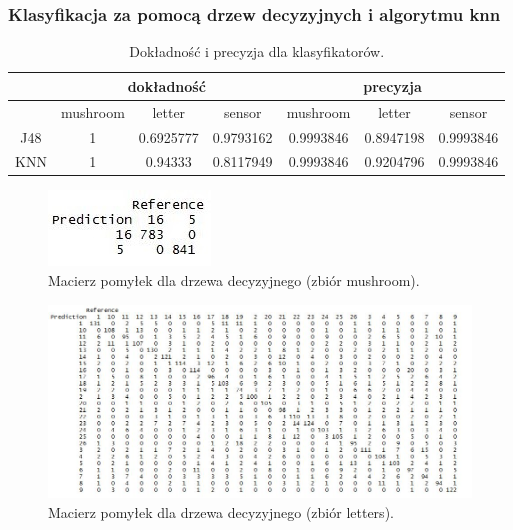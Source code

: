 \documentclass[11pt,a4paper,twoside]{article}
\begin{document}

\subsubsection{Klasyfikacja za pomocą drzew decyzyjnych i algorytmu knn}

\begin{table}[ht]
\centering
\caption{Dokładność i precyzja dla klasyfikatorów.}
\label{accPrec_v2}
\begin{tabular}{|*{7}{c|}}
\hline
 & \multicolumn{3}{c|}{dokładność} & \multicolumn{3}{c|}{precyzja} \\\hline
 & mushroom & letter & sensor & mushroom & letter & sensor \\\hline
J48   &   1      &   0.6925777   &    0.9793162    &    0.9993846    &   0.8947198    &   0.9993846   \\\hline
 KNN &   1      &    0.94333      &   0.8117949     &    0.9993846    &   0.9204796    &   0.9993846   \\\hline
\end{tabular}
\end{table}

\begin{figure}[ht]
\centering
\includegraphics[scale=0.9]{confMatrixJ48_mushroom.JPG}
\caption{Macierz pomyłek dla drzewa decyzyjnego (zbiór mushroom).}
\label{confMatrixJ48}
\end{figure}

\begin{figure}[H]
\centering
\includegraphics[scale=0.6]{confMatrixJ48_letters.JPG}
\caption{Macierz pomyłek dla drzewa decyzyjnego (zbiór letters).}
\label{confMatrixJ48}
\end{figure}
\end{document}
